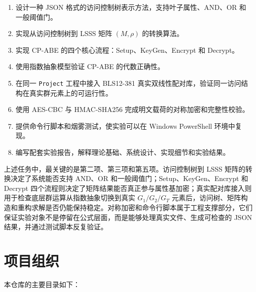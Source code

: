 \begin{enumerate}
    \item 设计一种 JSON 格式的访问控制树表示方法，支持叶子属性、AND、OR 和一般阈值门。
    \item 实现从访问控制树到 LSSS 矩阵 $(M,\rho)$ 的转换算法。
    \item 实现 CP-ABE 的四个核心流程：Setup、KeyGen、Encrypt 和 Decrypt。
    \item 使用指数抽象模型验证 CP-ABE 的代数正确性。
    \item 在同一 \verb|Project| 工程中接入 BLS12-381 真实双线性配对库，验证同一访问结构在真实群元素上的可运行性。
    \item 使用 AES-CBC 与 HMAC-SHA256 完成明文载荷的对称加密和完整性校验。
    \item 提供命令行脚本和烟雾测试，使实验可以在 Windows PowerShell 环境中复现。
    \item 编写配套实验报告，解释理论基础、系统设计、实现细节和实验结果。
\end{enumerate}

上述任务中，最关键的是第二项、第三项和第五项。访问控制树到 LSSS 矩阵的转换决定了系统能否支持 AND、OR 和一般阈值门；Setup、KeyGen、Encrypt 和 Decrypt 四个流程则决定了矩阵结果能否真正参与属性基加密；真实配对库接入则用于检查底层群运算从指数抽象切换到真实 $G_1/G_2/G_T$ 元素后，访问树、矩阵构造和重构求解是否仍能保持稳定。对称加密和命令行脚本属于工程支撑部分，它们保证实验对象不是停留在公式层面，而是能够处理真实文件、生成可检查的 JSON 结果，并通过测试脚本反复验证。

\section{项目组织}

本仓库的主要目录如下：

